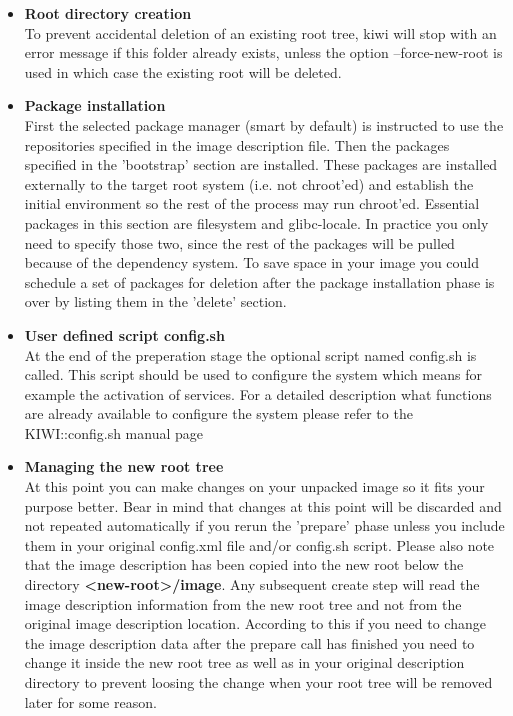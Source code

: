 \begin{itemize}
\item \textbf{Root directory creation}\\
      To prevent accidental deletion of an existing root tree, kiwi will
      stop with an error message if this folder already exists, unless the
      option --force-new-root is used in which case the existing root will
      be deleted.
\item \textbf{Package installation}\\
      First the selected package manager (smart by default) is instructed to
      use the repositories specified in the image description file.
      Then the packages specified in the 'bootstrap' section are installed.
      These packages are installed externally to the target root system
      (i.e. not chroot'ed) and establish the initial environment so the rest
      of  the process may run chroot'ed. Essential packages in this section
      are filesystem and glibc-locale. In practice you only need to
      specify those two, since the rest of the packages will be pulled
      because of the dependency system. To save space in your image you
      could schedule a set of packages for deletion after the package
      installation phase is over by listing them in the 'delete' section.
\item \textbf{User defined script config.sh}\\
      At the end of the preperation stage the optional script named config.sh
      is called. This script should be used to configure the system which means
      for example the activation of services. For a detailed description what
      functions are already available to configure the system please refer to
      the KIWI::config.sh manual page
\item \textbf{Managing the new root tree}\\
      At this point you can make changes on your unpacked image so it fits
      your purpose better. Bear in mind that changes at this point will be
      discarded and not repeated automatically if you rerun the 'prepare'
      phase unless you include them in your original config.xml file and/or
      config.sh script. Please also note that the image description has
      been copied into the new root below the directory
      \textbf{<new-root>/image}. Any subsequent create step will read
      the image description information from the new root tree and not
      from the original image description location. According to this
      if you need to change the image description data
      after the prepare call has finished you need to change it inside the
      new root tree as well as in your original description directory to
      prevent loosing the change when your root tree will be removed later
      for some reason.
\end{itemize}

